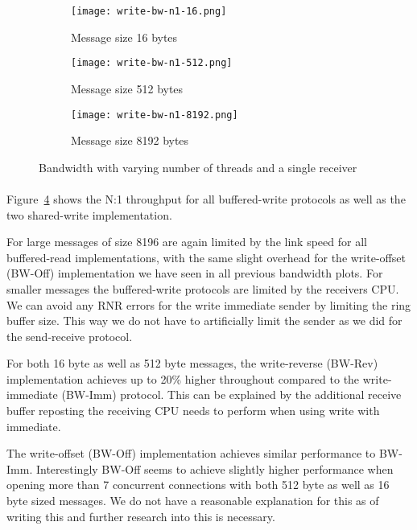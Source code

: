 \begin{figure}[ht]
  \centering
\begin{subfigure}[b]{0.49\textwidth}
  \centering
  \texttt{[image: write-bw-n1-16.png]}
  \caption{Message size 16 bytes}
  \label{fig:plot-write-bw-n1-16}
\end{subfigure}
\begin{subfigure}[b]{0.49\textwidth}
  \centering
  \texttt{[image: write-bw-n1-512.png]}
  \caption{Message size 512 bytes}
  \label{fig:plot-write-bw-n1-512}
\end{subfigure}
\begin{subfigure}[b]{0.49\textwidth}
  \centering
  \texttt{[image: write-bw-n1-8192.png]}
  \caption{Message size 8192 bytes}
  \label{fig:plot-write-bw-n1-8192}
\end{subfigure}
  \caption{Bandwidth with varying number of threads and a single receiver}
  \label{fig:plot-write-bw-n1}
\end{figure}

\paragraph{} Figure~\ref{fig:plot-write-bw-n1} shows the N:1 throughput for all buffered-write protocols as 
well as the two shared-write implementation.

For large messages of size 8196 are again limited by the link speed for all buffered-read implementations, 
with the same slight overhead for the write-offset (BW-Off) implementation we have seen in all previous bandwidth plots.
For smaller messages the buffered-write protocols are limited by the receivers CPU. We can avoid any 
RNR errors for the write immediate sender by limiting the ring buffer size. This way we do not have to artificially limit 
the sender as we did for the send-receive protocol.

For both 16 byte as well as 512 byte messages, the write-reverse (BW-Rev) implementation achieves up to 20\% higher throughout
compared to the write-immediate (BW-Imm) protocol. This can be explained by the additional receive buffer reposting the 
receiving CPU needs to perform when using write with immediate. 

The write-offset (BW-Off) implementation achieves similar performance to BW-Imm. Interestingly BW-Off seems to achieve slightly 
higher performance when opening more than 7 concurrent connections with both 512 byte as well as 16 byte sized messages. We do 
not have a reasonable explanation for this as of writing this and further research into this is necessary.


